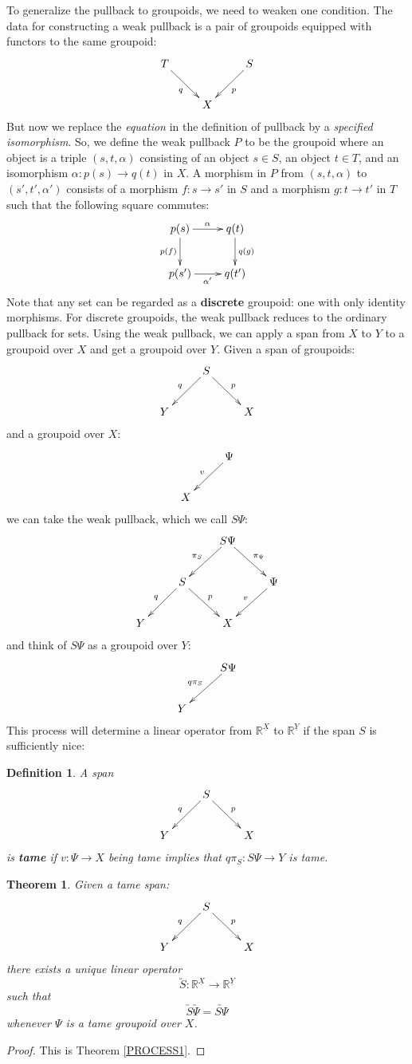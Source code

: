 \documentclass{article}
\renewcommand{\to}{\rightarrow}
\newcommand{\maps}{\colon}
\newcommand{\R}{{\mathbb R}}
\renewcommand{\u}[1]{\underline{#1}}
\newtheorem{definition}[thm]{Definition}
\newtheorem*{theorem*}{Theorem}
\begin{document}
To generalize the pullback to groupoids, we need to weaken one
condition.  The data for constructing a weak pullback is a pair of
groupoids equipped with functors to the same groupoid:
\[
\xymatrix{
& T \ar[dr]_{q} & & S \ar[dl]^{p} & \\
 & & X & & 
}
\]  
But now we replace the {\it equation} in the definition of pullback
by a {\it specified isomorphism}.  So, we define the weak pullback 
$P$ to be the groupoid where an object is a triple $(s,t,\alpha)$ 
consisting of an object $s \in S$, an object $t \in T$, and an 
isomorphism $\alpha \maps p(s) \to q(t)$ in $X$.  A morphism
in $P$ from $(s,t,\alpha)$ to $(s',t',\alpha')$ consists of a morphism
$f \maps s \to s'$ in $S$ and a morphism $g \maps t \to t'$ in $T$
such that the following square commutes:
\[
\xymatrix{
p(s) \ar[d]_{p(f)} \ar[r]^{\alpha} & q(t) \ar[d]^{q(g)} \\
p(s') \ar[r]_{\alpha'} & q(t')
}
\]
Note that any set can be regarded as a {\bf discrete} groupoid:
one with only identity morphisms.  For discrete groupoids, the weak
pullback reduces to the ordinary pullback for sets.
Using the weak pullback, we can apply a span from $X$ to $Y$ to a groupoid
over $X$ and get a groupoid over $Y$.  Given a span of groupoids:
\[
\xymatrix{
& S\ar[dl]_{q} \ar[dr]^{p} & \\
Y & & X
}
\]
and a groupoid over $X$:
\[
\xymatrix{
   & \Psi \ar[dl]_{v} \\
   X &  
}
\]
we can take the weak pullback, which we call $S\Psi$:
\[
\xymatrix{
& & S\Psi \ar[dl]_{\pi_S}\ar[dr]^{\pi_{\Psi}} & \\
& S \ar[dl]_{q} \ar[dr]^{p} & & \Psi \ar[dl]_{v} \\
Y & & X &  
}
\]
and think of $S\Psi$ as a groupoid over $Y$:
\[
\xymatrix{
& S\Psi \ar[dl]_{q \pi_S}  \\
Y  
}
\]
This process will determine a linear operator from $\R^{\u X}$ 
to $\R^{\u Y}$ if the span $S$ is sufficiently nice:
\begin{definition}
A span
\[
\xymatrix{
& S\ar[dl]_{q} \ar[dr]^{p} & \\
Y & & X
}
\]
is {\bf tame} if $v \maps \Psi \to X$ being tame implies that 
$q\pi_{S} \maps S\Psi \to Y$ is tame.
\end{definition}

\begin{theorem*}
Given a tame span:
\[
\xymatrix{
& S\ar[dl]_{q} \ar[dr]^{p} & \\
Y & & X
}
\]
there exists a unique linear operator
\[ \utilde{S} \maps \R^{\u{X}} \to \R^{\u{Y}} \]
such that
\[ \utilde{S}\utilde{\Psi} = \utilde{S\Psi} \]
whenever $\Psi$ is a tame groupoid over $X$.
\end{theorem*}
\begin{proof} This is Theorem \ref{PROCESS1}. \end{proof}
\end{document}
